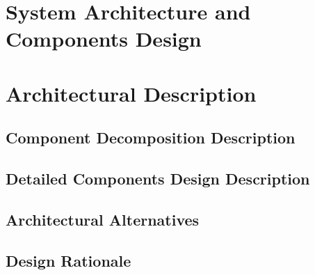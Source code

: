\documentclass[11pt, a4paper]{report}
\begin{document}
\pagebreak


\chapter{System Architecture and Components Design}%
\label{cha:SACD}


\chapter{Architectural Description}


\section{Component Decomposition Description}


\section{Detailed Components Design Description}


\section{Architectural Alternatives}


\section{Design Rationale}
\end{document}
